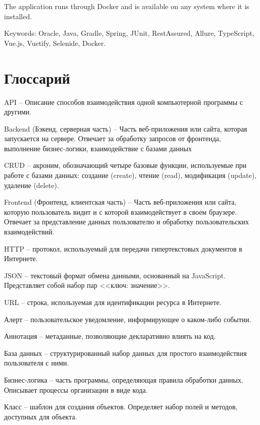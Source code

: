 \documentclass[a4paper,article]{article}
\begin{document}
\begin{sloppypar}
    The application runs through Docker and is available on any system where it is installed.

    Keywords: Oracle, Java, Gradle, Spring, JUnit, RestAssured, Allure, TypeScript, Vue.js, Vuetify, Selenide, Docker.
    

    \newpage

    \section*{Глоссарий}

    API -- Описание способов взаимодействия одной компьютерной программы с другими.

    Backend (Бэкенд, серверная часть) -- Часть веб-приложения или сайта, которая запускается на сервере. Отвечает за обработку запросов от фронтенда, выполнение бизнес-логики, взаимодействие с базами данных

    CRUD -- акроним, обозначающий четыре базовые функции, используемые при работе с базами данных: создание (create), чтение (read), модификация (update), удаление (delete).

    Frontend (Фронтенд, клиентская часть) -- Часть веб-приложения или сайта, которую пользователь видит и с которой взаимодействует в своем браузере. Отвечает за представление данных пользователю и обработку пользовательских взаимодействий.

    HTTP -- протокол, используемый для передачи гипертекстовых документов в Интернете.

    JSON -- текстовый формат обмена данными, основанный на JavaScript. Представляет собой набор пар <<ключ: значение>>.

    URL -- строка, используемая для идентификации ресурса в Интернете.

    Алерт -- пользовательское уведомление, информирующее о каком-либо событии.

    Аннотация -- метаданные, позволяющие декларативно влиять на код.

    База данных -- структурированный набор данных для простого взаимодействия пользователя с ними.

    Бизнес-логика -- часть программы, определяющая правила обработки данных. Описывает процессы организации в виде кода.

    Класс -- шаблон для создания объектов. Определяет набор полей и методов, доступных для объекта.


\end{sloppypar}
\end{document}
